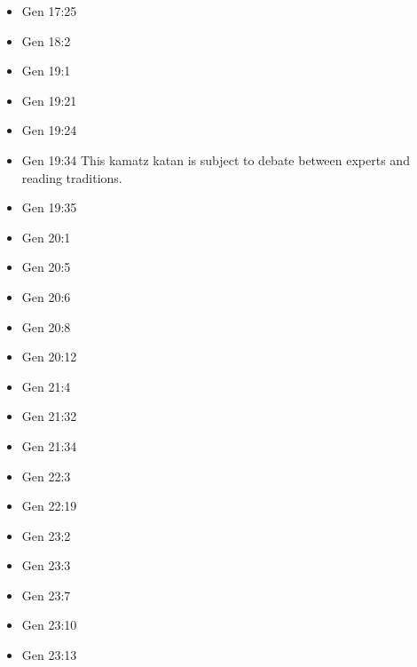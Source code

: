 \documentclass[14pt]{article}
\begin{document}
\begin{multicols}{2}
\begin{itemize}
\item Gen 17:25

\item Gen 18:2

\item Gen 19:1

\item Gen 19:21

\item Gen 19:24

\item Gen 19:34 This kamatz katan is subject to debate between experts and reading traditions.

\item Gen 19:35

\item Gen 20:1

\item Gen 20:5

\item Gen 20:6

\item Gen 20:8

\item Gen 20:12

\item Gen 21:4

\item Gen 21:32

\item Gen 21:34

\item Gen 22:3

\item Gen 22:19

\item Gen 23:2

\item Gen 23:3

\item Gen 23:7

\item Gen 23:10

\item Gen 23:13


\end{itemize}
\end{multicols}
\end{document}
